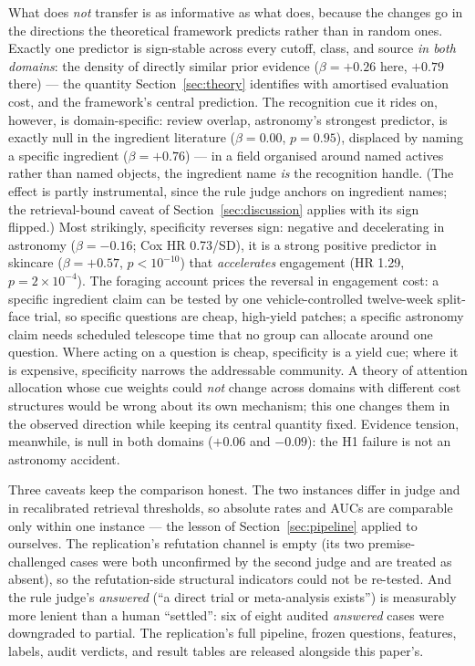 \documentclass[11pt]{article}
\begin{document}
What does \emph{not} transfer is as informative as what does, because
the changes go in the directions the theoretical framework predicts
rather than in random ones. Exactly one predictor is sign-stable across
every cutoff, class, and source \emph{in both domains}: the density of
directly similar prior evidence ($\beta=+0.26$ here, $+0.79$ there) ---
the quantity Section~\ref{sec:theory} identifies with amortised
evaluation cost, and the framework's central prediction. The
recognition cue it rides on, however, is domain-specific: review
overlap, astronomy's strongest predictor, is exactly null in the
ingredient literature ($\beta=0.00$, $p=0.95$), displaced by naming a
specific ingredient ($\beta=+0.76$) --- in a field organised around
named actives rather than named objects, the ingredient name \emph{is}
the recognition handle. (The effect is partly instrumental, since the
rule judge anchors on ingredient names; the retrieval-bound caveat of
Section~\ref{sec:discussion} applies with its sign flipped.) Most
strikingly, specificity reverses sign: negative and decelerating in
astronomy ($\beta=-0.16$; Cox HR 0.73/SD), it is a strong positive
predictor in skincare ($\beta=+0.57$, $p<10^{-10}$) that
\emph{accelerates} engagement (HR 1.29, $p=2\times10^{-4}$). The
foraging account prices the reversal in engagement cost: a specific
ingredient claim can be tested by one vehicle-controlled twelve-week
split-face trial, so specific questions are cheap, high-yield patches;
a specific astronomy claim needs scheduled telescope time that no group
can allocate around one question. Where acting on a question is cheap,
specificity is a yield cue; where it is expensive, specificity narrows
the addressable community. A theory of attention allocation whose cue
weights could \emph{not} change across domains with different cost
structures would be wrong about its own mechanism; this one changes
them in the observed direction while keeping its central quantity
fixed. Evidence tension, meanwhile, is null in both domains ($+0.06$
and $-0.09$): the H1 failure is not an astronomy accident.

Three caveats keep the comparison honest. The two instances differ in
judge and in recalibrated retrieval thresholds, so absolute rates and
AUCs are comparable only within one instance --- the lesson of
Section~\ref{sec:pipeline} applied to ourselves. The replication's
refutation channel is empty (its two premise-challenged cases were both
unconfirmed by the second judge and are treated as absent), so the
refutation-side structural indicators could not be re-tested. And the
rule judge's \emph{answered} (``a direct trial or meta-analysis
exists'') is measurably more lenient than a human ``settled'': six of
eight audited \emph{answered} cases were downgraded to partial. The
replication's full pipeline, frozen questions, features, labels, audit
verdicts, and result tables are released alongside this paper's.
\end{document}
